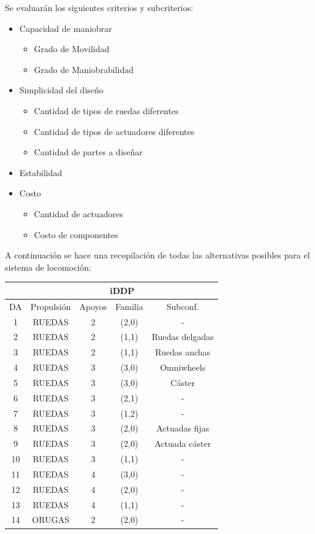 Se evaluarán los siguientes criterios y subcriterios:
\begin{itemize}
	\item Capacidad de maniobrar
	\begin{itemize}
		\item Grado de Movilidad
		\item Grado de Maniobrabilidad
	\end{itemize}
	\item Simplicidad del diseño
	\begin{itemize}
		\item Cantidad de tipos de ruedas diferentes
		\item Cantidad de tipos de actuadores diferentes
		\item Cantidad de partes a diseñar
	\end{itemize}
	\item Estabilidad
	\item Costo
	\begin{itemize}
		\item Cantidad de actuadores
		\item Costo de componentes
	\end{itemize}
\end{itemize}


A continuación se hace una recopilación de todas las alternativas posibles para el sistema de locomoción:

\begin{center}
\begin{tabular}{|c|c|c|c|c|}
	\hline
	  & \multicolumn{4}{c|}{iDDP} \\
	\hline
	DA & Propulsión & Apoyos & Familia & Subconf. \\
	\hline
	1 & RUEDAS & 2 & (2,0) & - \\
	\hline
	2 & RUEDAS & 2 & (1,1) & Ruedas delgadas \\
	\hline
	3 & RUEDAS & 2 & (1,1) & Ruedas anchas \\
	\hline
	4 & RUEDAS & 3 & (3,0) & Omniwheels \\
	\hline
	5 & RUEDAS & 3 & (3,0) & Cáster \\
	\hline
	6 & RUEDAS & 3 & (2,1) & - \\
	\hline
	7 & RUEDAS & 3 & (1,2) & - \\
	\hline
	8 & RUEDAS & 3 & (2,0) & Actuadas fijas \\
	\hline
	9 & RUEDAS & 3 & (2,0) & Actuada cáster \\
	\hline
	10 & RUEDAS & 3 & (1,1) & - \\
	\hline
	11 & RUEDAS & 4 & (3,0) & - \\
	\hline
	12 & RUEDAS & 4 & (2,0) & - \\
	\hline
	13 & RUEDAS & 4 & (1,1) & - \\
	\hline
	14 & ORUGAS & 2 & (2,0) & - \\
	\hline
\end{tabular}
\end{center}

